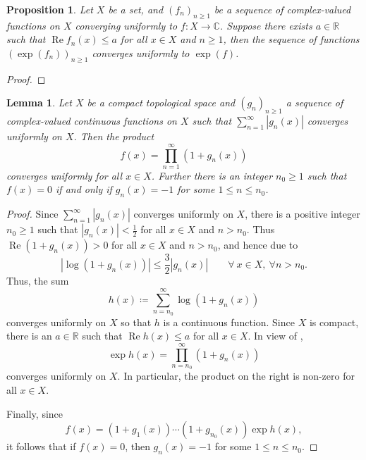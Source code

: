 \documentclass[11pt]{article}
\theoremstyle{thmstyle}
\newtheorem{lemma}[theorem]{Lemma}
\newtheorem{proposition}[theorem]{Proposition}
\theoremstyle{defstyle}
\newcommand{\R}{\mathbb{R}}
\newcommand{\bbC}{\mathbb{C}}
\renewcommand{\le}{\leqslant}
\renewcommand{\ge}{\geqslant}
\renewcommand{\Re}{\operatorname{Re}}
\begin{document}
\begin{proposition}
    Let $X$ be a set, and $(f_n)_{n\ge 1}$ be a sequence of complex-valued functions on $X$ converging uniformly to $f\colon X\to\bbC$. Suppose there exists $a\in\R$ such that $\Re f_n(x)\le a$ for all $x\in X$ and $n\ge 1$, then the sequence of functions $\left(\exp(f_n)\right)_{n\ge 1}$ converges uniformly to $\exp(f)$.
\end{proposition}
\begin{proof}
\end{proof}

\begin{lemma}
    Let $X$ be a compact topological space and $(g_n)_{n\ge 1}$ a sequence of complex-valued continuous functions on $X$ such that $\displaystyle\sum_{n = 1}^\infty |g_n(x)|$ converges uniformly on $X$. Then the product 
    \begin{equation*}
        f(x) = \prod_{n = 1}^\infty\left(1 + g_n(x)\right)
    \end{equation*}
    converges uniformly for all $x\in X$. Further there is an integer $n_0\ge 1$ such that $f(x) = 0$ if and only if $g_n(x) = -1$ for some $1\le n\le n_0$.
\end{lemma}
\begin{proof}
    Since $\displaystyle\sum_{n = 1}^\infty |g_n(x)|$ converges uniformly on $X$, there is a positive integer $n_0\ge 1$ such that $|g_n(x)| < \frac{1}{2}$ for all $x\in X$ and $n > n_0$. Thus $\Re\left(1 + g_n(x)\right) > 0$ for all $x\in X$ and $n > n_0$, and hence due to 
    \begin{equation*}
        \left|\log\left(1 + g_n(x)\right)\right|\le\frac{3}{2}|g_n(x)|\qquad\forall~x\in X,~\forall n > n_0.
    \end{equation*}
    Thus, the sum 
    \begin{equation*}
        h(x)\coloneq\sum_{n = n_0}^\infty \log(1 + g_n(x))
    \end{equation*}
    converges uniformly on $X$ so that $h$ is a continuous function. Since $X$ is compact, there is an $a\in\R$ such that $\Re h(x)\le a$ for all $x\in X$. In view of , 
    \begin{equation*}
        \exp h(x) = \prod_{n = n_0}^\infty \left(1 + g_n(x)\right)
    \end{equation*}
    converges uniformly on $X$. In particular, the product on the right is non-zero for all $x\in X$.

    Finally, since 
    \begin{equation*}
        f(x) = (1 + g_1(x))\cdots(1 + g_{n_0}(x))\exp h(x),
    \end{equation*}
    it follows that if $f(x) = 0$, then $g_n(x) = -1$ for some $1\le n\le n_0$.
\end{proof}
\end{document}
